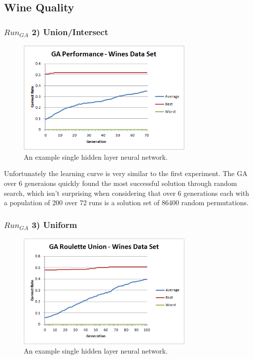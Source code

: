\documentclass[journal]{IEEEtran}
\begin{document}
  \subsection{Wine Quality}
    \subsubsection*{$Run_{GA}$ 2) Union/Intersect}
      \begin{figure}[here]%
        \centering
        \includegraphics[width=3.4in]{wine_performance_new}
        \caption{An example single hidden layer neural network.}
        \label{fig:wine_performace_new}
      \end{figure}
      Unfortunately the learning curve is very similar to the first experiment. The GA over 6 generaions
      quickly found the most successful solution through random search, which isn't surprising when considering
      that over 6 generations each with a population of 200 over 72 runs is a solution set of 86400 random permutations.
      
    \subsubsection*{$Run_{GA}$ 3) Uniform}
      \begin{figure}[here]%
        \centering
        \includegraphics[width=3.4in]{wine_uniform}
        \caption{An example single hidden layer neural network.}
        \label{fig:wine_uniform}
      \end{figure}
\end{document}
